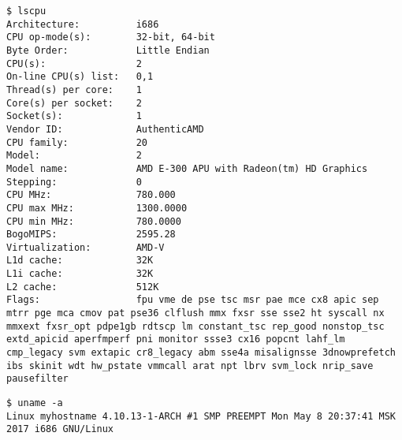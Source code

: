  \label{sec:appendix}







\begin{lstlisting}[caption=\texttt{lscpu}, label=app:lscpu]
$ lscpu
Architecture:          i686
CPU op-mode(s):        32-bit, 64-bit
Byte Order:            Little Endian
CPU(s):                2
On-line CPU(s) list:   0,1
Thread(s) per core:    1
Core(s) per socket:    2
Socket(s):             1
Vendor ID:             AuthenticAMD
CPU family:            20
Model:                 2
Model name:            AMD E-300 APU with Radeon(tm) HD Graphics
Stepping:              0
CPU MHz:               780.000
CPU max MHz:           1300.0000
CPU min MHz:           780.0000
BogoMIPS:              2595.28
Virtualization:        AMD-V
L1d cache:             32K
L1i cache:             32K
L2 cache:              512K
Flags:                 fpu vme de pse tsc msr pae mce cx8 apic sep mtrr pge mca cmov pat pse36 clflush mmx fxsr sse sse2 ht syscall nx mmxext fxsr_opt pdpe1gb rdtscp lm constant_tsc rep_good nonstop_tsc extd_apicid aperfmperf pni monitor ssse3 cx16 popcnt lahf_lm cmp_legacy svm extapic cr8_legacy abm sse4a misalignsse 3dnowprefetch ibs skinit wdt hw_pstate vmmcall arat npt lbrv svm_lock nrip_save pausefilter
\end{lstlisting}

\begin{lstlisting}[caption=\texttt{uname}, label=app:uname]
$ uname -a
Linux myhostname 4.10.13-1-ARCH #1 SMP PREEMPT Mon May 8 20:37:41 MSK 2017 i686 GNU/Linux
\end{lstlisting}

\clearpage
